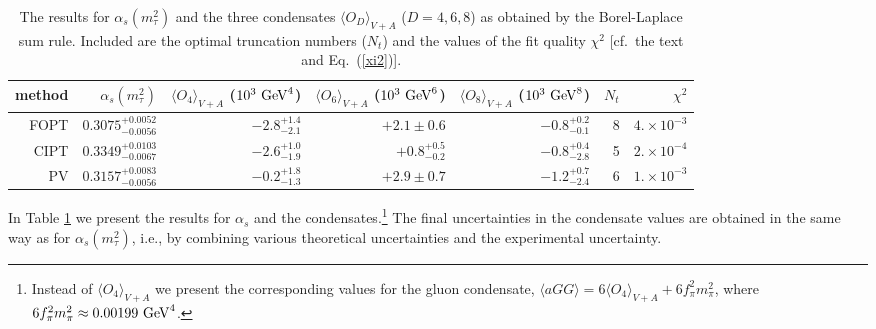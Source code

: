 \documentclass[aps,nofootinbib,showkeys,noshowpacs,preprintnumbers,amsmath,amssymb]{revtex4}
\begin{document}
\begin{table}
  \caption{The results for $\alpha_s(m_{\tau}^2)$ and the three condensates $\langle O_D \rangle_{V+A}$ ($D=4, 6,8$) as obtained by the Borel-Laplace sum rule. Included are the optimal truncation numbers ($N_t$) and the values of the fit quality $\chi^2$ [cf.~the text and Eq.~(\ref{xi2})].}
 \label{tabBL}
\begin{ruledtabular}
\begin{tabular}{r|rrrr|r|r}
  method & $\alpha_s(m_{\tau}^2)$ &  $\langle O_4 \rangle_{V+A}$ ($10^3 \ {\rm GeV}^4$) & $\langle O_6 \rangle_{V+A}$ ($10^3 \ {\rm GeV}^6$)  & $\langle O_8 \rangle_{V+A}$ ($10^3 \ {\rm GeV}^8$) & $N_t$ & $\chi^2$ \\
\hline
FOPT       &  $0.3075^{+0.0052}_{-0.0056}$      & $-2.8^{+1.4}_{-2.1}$   &  $+2.1 \pm 0.6$  &  $-0.8^{+0.2}_{-0.1}$ & 8 & $4. \times 10^{-3}$ \\
CIPT      &   $0.3349^{+0.0103}_{-0.0067}$ &  $-2.6^{+1.0}_{-1.9}$ & $+0.8^{+0.5}_{-0.2}$ & $-0.8^{+0.4}_{-2.8}$ & 5 &  $2. \times 10^{-4}$ \\
PV      &  $0.3157^{+0.0083}_{-0.0056}$ & $-0.2^{+1.8}_{-1.3}$ & $+2.9 \pm 0.7$ & $ -1.2^{+0.7}_{-2.4}$ & 6 &  $1. \times 10^{-3}$
\end{tabular}
\end{ruledtabular}
\end{table}
In Table \ref{tabBL} we present the results for $\alpha_s$ and the condensates.\footnote{
Instead of $\langle O_4 \rangle_{V+A}$ we present the corresponding values for the gluon condensate, $\langle a GG \rangle = 6  \langle O_4 \rangle_{V+A} + 6 f^2_{\pi} m^2_{\pi}$, where $6 f^2_{\pi} m^2_{\pi} \approx 0.00199 \ {\rm GeV}^4$.} 
The final uncertainties in the condensate values are obtained in the same way as for $\alpha_s(m_{\tau}^2)$, i.e., by combining various theoretical uncertainties and the experimental uncertainty.
\end{document}
